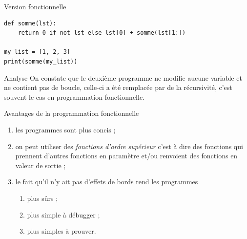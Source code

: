 \documentclass[10pt]{beamer}
\begin{document}
\begin{frame}[fragile]{Version fonctionnelle}
\begin{verbatim}
def somme(lst):
    return 0 if not lst else lst[0] + somme(lst[1:])

my_list = [1, 2, 3]
print(somme(my_list))
\end{verbatim}
\end{frame}

\begin{frame}{Analyse}
	On constate que le deuxième programme ne modifie aucune variable et ne contient pas de boucle, celle-ci a été remplacée par de la récursivité, c'est souvent le cas en programmation fonctionnelle.
\end{frame}

\begin{frame}{Avantages de la programmation fonctionnelle}
\begin{enumerate}[--]
	\item 	les programmes sont plus concis ;\pause
	\item 	on peut utiliser des \textit{fonctions d'ordre supérieur} c'est à dire des fonctions qui prennent d'autres fonctions en paramètre et/ou renvoient des fonctions en valeur de sortie ; \pause
	\item 	le fait qu'il n'y ait pas d'effets de bords rend les programmes \pause
	\begin{enumerate}[--]
		\item 	plus sûrs ; \pause 
		\item 	plus simple à débugger ; \pause
		\item 	plus simples à prouver. \pause
	\end{enumerate}
\end{enumerate}
\end{frame}
\end{document}
